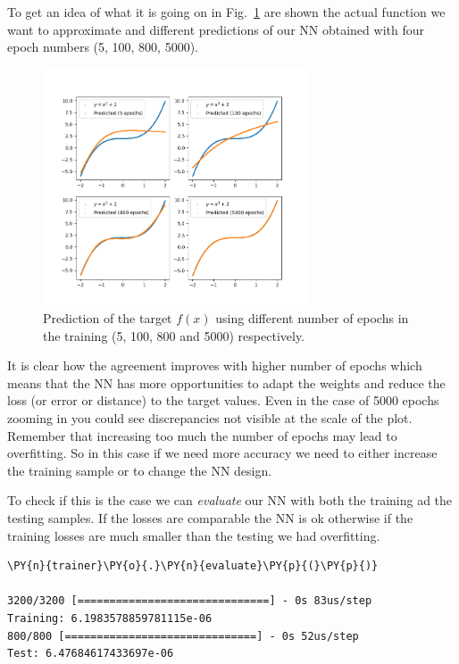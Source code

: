 To get an idea of what it is going on in Fig.~\ref{fig:training_vs_epochs} are shown the
actual function we want to approximate and different predictions of our
NN obtained with four epoch numbers (5, 100, 800, 5000).

\begin{figure}[htb]
	\centering
	\includegraphics[width=0.7\textwidth]{figures/training_vs_epoch}
	\caption{Prediction of the target $f(x)$ using different number of epochs in the training (5, 100, 800 and 5000) respectively.}
	\label{fig:training_vs_epochs}
\end{figure}

It is clear how the agreement improves with higher number of epochs
which means that the NN has more opportunities to adapt the weights and
reduce the loss (or error or distance) to the target values. Even in the
case of 5000 epochs zooming in you could see discrepancies not visible
at the scale of the plot. Remember that increasing too much the number
of epochs may lead to overfitting. So in this case if we need more
accuracy we need to either increase the training sample or to change the
NN design.

To check if this is the case we can \emph{evaluate} our NN with both the
training ad the testing samples. If the losses are comparable the NN is
ok otherwise if the training losses are much smaller than the testing we
had overfitting.

\begin{codebox}[breakable, size=fbox, boxrule=1pt, pad at break*=1mm,colback=cellbackground, colframe=cellborder]
\begin{Verbatim}[commandchars=\\\{\}]
\PY{n}{trainer}\PY{o}{.}\PY{n}{evaluate}\PY{p}{(}\PY{p}{)}

3200/3200 [==============================] - 0s 83us/step
Training: 6.1983578859781115e-06
800/800 [==============================] - 0s 52us/step
Test: 6.47684617433697e-06
\end{Verbatim}
\end{codebox}

